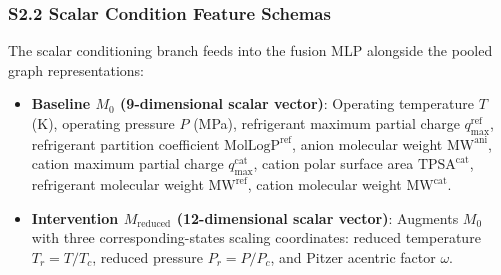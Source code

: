 \subsubsection*{S2.2 Scalar Condition Feature Schemas}
The scalar conditioning branch feeds into the fusion MLP alongside the pooled graph representations:
\begin{itemize}
    \item \textbf{Baseline $M_0$ (9-dimensional scalar vector)}: Operating temperature $T$ (K), operating pressure $P$ (MPa), refrigerant maximum partial charge $q_{\mathrm{max}}^{\mathrm{ref}}$, refrigerant partition coefficient $\text{MolLogP}^{\mathrm{ref}}$, anion molecular weight $\text{MW}^{\mathrm{ani}}$, cation maximum partial charge $q_{\mathrm{max}}^{\mathrm{cat}}$, cation polar surface area $\text{TPSA}^{\mathrm{cat}}$, refrigerant molecular weight $\text{MW}^{\mathrm{ref}}$, cation molecular weight $\text{MW}^{\mathrm{cat}}$.
    \item \textbf{Intervention $M_{\mathrm{reduced}}$ (12-dimensional scalar vector)}: Augments $M_0$ with three corresponding-states scaling coordinates: reduced temperature $T_r = T / T_c$, reduced pressure $P_r = P / P_c$, and Pitzer acentric factor $\omega$.
\end{itemize}


